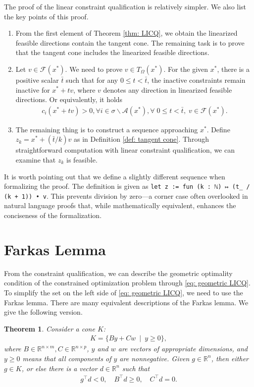 \documentclass[sn-mathphys]{JORSC-jnl}%
\theoremstyle{thmstyleone}%
\newtheorem{theorem}{Theorem}%
\theoremstyle{thmstylethree}%
\newcommand{\lean}[1]{\lstinline[language=lean, mathescape=true]{#1}}
\begin{document}
The proof of the linear constraint qualification is relatively simpler. We also list the key points of this proof.
\begin{enumerate}
    \item From the first element of Theorem \ref{thm: LICQ}, we obtain the linearized feasible directions contain the tangent cone. The remaining task is to prove that the tangent cone includes the linearized feasible directions. 
    \item Let $v \in \mathcal{F}(x^\ast)$. We need to prove $v \in T_\Omega(x^\ast)$. For the given $x^\ast$, there is a positive scalar $\bar{t}$ such that for any $0 \leq t < \bar{t}$, the inactive constraints remain inactive for $x^\ast + t v$, where $v$ denotes any direction in linearized feasible directions. Or equivalently, it holds
    \begin{align*}
        c_i(x^\ast+t v) > 0, \forall i \in \sigma \backslash \mathcal{A}(x^\ast), \forall \; 0 \leq t < \bar{t}, \; v \in \mathcal{F}(x^\ast).
    \end{align*}
    \item The remaining thing is to construct a sequence approaching $x^\ast$. Define $z_k = x^\ast + (\bar{t}/k) v$ as in Definition \ref{def: tangent cone}. Through straightforward computation with linear constraint qualification, we can examine that $z_k$ is feasible.
\end{enumerate}
It is worth pointing out that we define a slightly different sequence when formalizing the proof. The definition is given as \lean{let z := fun (k : ℕ) ↦ (t_ / (k + 1)) • v}. This prevents division by zero—a corner case often overlooked in natural language proofs that, while mathematically equivalent, enhances the conciseness of the formalization.
\section{Farkas Lemma}\label{sec: Farkas}
From the constraint qualification, we can describe the geometric optimality condition of the constrained optimization problem through \eqref{eq: geometric LICQ}. To simplify the set on the left side of \eqref{eq: geometric LICQ}, we need to use the Farkas lemma. There are many equivalent descriptions of the Farkas lemma. We give the following version.
\begin{theorem}\label{thm: Farkas}
    Consider a cone $K$:
    \begin{align}
         K = \{By + Cw\ \mid \ y \geqslant 0\},
         \label{eq: Farkas K}
    \end{align}
    where $B \in \mathbb{R}^{n\times m}, C \in \mathbb{R}^{n\times p}$, $y$ and $w$ are vectors of appropriate dimensions, and $y \geqslant 0$ means that all components of $y$ are nonnegative. Given $g \in \mathbb{R}^n$, then either $g \in K$, or else there is a vector $d \in \mathbb{R}^n$ such that
\begin{align}\label{eq: Farkas theorem}
    g^\top d < 0,\quad B^\top d \geqslant 0,\quad C^\top d = 0.
\end{align}
\end{theorem}
\end{document}
